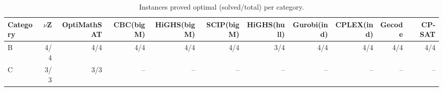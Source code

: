 \begin{table}[t]
\centering
\caption{Instances proved optimal (solved/total) per category.}
\label{tab:exp-solved}
\small
\begin{tabular}{@{}lrrrrrrrrrr@{}}
\toprule
Category & $\nu$Z & OptiMathSAT & CBC(bigM) & HiGHS(bigM) & SCIP(bigM) & HiGHS(hull) & Gurobi(ind) & CPLEX(ind) & Gecode & CP-SAT \\
\midrule
B & 4/4 & 4/4 & 4/4 & 4/4 & 4/4 & 3/4 & 4/4 & 4/4 & 4/4 & 4/4 \\
C & 3/3 & 3/3 & -- & -- & -- & -- & -- & -- & -- & -- \\
\bottomrule
\end{tabular}
\end{table}
